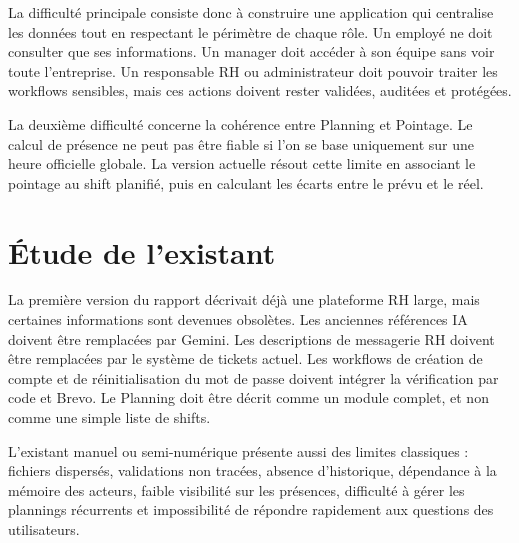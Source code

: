\documentclass[12pt,a4paper]{report}
\begin{document}
La difficulté principale consiste donc à construire une application qui centralise les données tout en respectant le périmètre de chaque rôle. Un employé ne doit consulter que ses informations. Un manager doit accéder à son équipe sans voir toute l'entreprise. Un responsable RH ou administrateur doit pouvoir traiter les workflows sensibles, mais ces actions doivent rester validées, auditées et protégées.

La deuxième difficulté concerne la cohérence entre Planning et Pointage. Le calcul de présence ne peut pas être fiable si l'on se base uniquement sur une heure officielle globale. La version actuelle résout cette limite en associant le pointage au shift planifié, puis en calculant les écarts entre le prévu et le réel.

\section{Étude de l'existant}
La première version du rapport décrivait déjà une plateforme RH large, mais certaines informations sont devenues obsolètes. Les anciennes références IA doivent être remplacées par Gemini. Les descriptions de messagerie RH doivent être remplacées par le système de tickets actuel. Les workflows de création de compte et de réinitialisation du mot de passe doivent intégrer la vérification par code et Brevo. Le Planning doit être décrit comme un module complet, et non comme une simple liste de shifts.

L'existant manuel ou semi-numérique présente aussi des limites classiques : fichiers dispersés, validations non tracées, absence d'historique, dépendance à la mémoire des acteurs, faible visibilité sur les présences, difficulté à gérer les plannings récurrents et impossibilité de répondre rapidement aux questions des utilisateurs.
\end{document}
